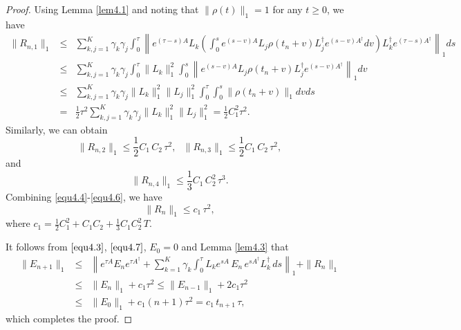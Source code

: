 \documentclass[10pt,a4paper]{amsart}
\begin{document}
\begin{proof}
Using Lemma \ref{lem4.1} and noting that $\|\rho(t)\|_1=1$ for any $t\geq0$, we have
\begin{eqnarray}\label{equ4.4}
\|R_{n,1}\|_1&\leq&\sum_{k,j=1}^K\gamma_k\gamma_j\int_0^{\tau}\left\|e^{(\tau-s)A}L_k
  \left(\int_0^se^{(s-v)A}L_j\rho(t_n+v)L_j^{\dag}e^{(s-v)A^{\dag}}dv\right)
  L_k^{\dag}e^{(\tau-s)A^{\dag}}\right\|_1ds\nonumber\\
  &\leq& \sum_{k,j=1}^K\gamma_k\gamma_j\int_0^{\tau}\|L_k\|_1^2
  \int_0^s\left\|e^{(s-v)A}L_j\rho(t_n+v)L_j^{\dag}e^{(s-v)A^{\dag}}\right\|_1dv\nonumber\\
  &\leq& \sum_{k,j=1}^K\gamma_k\gamma_j\|L_k\|_1^2\|L_j\|_1^2
  \int_0^{\tau}\int_0^s\|\rho(t_n+v)\|_1dvds\nonumber\\
  &=&\frac{1}{2}\tau^2\sum_{k,j=1}^K\gamma_k\gamma_j\|L_k\|_1^2\|L_j\|_1^2=\frac{1}{2}C_1^2\tau^2.
\end{eqnarray}
Similarly, we can obtain
\begin{equation}\label{equ4.5}
  \|R_{n,2}\|_1\leq\frac{1}{2}C_1 \, C_2 \, \tau^2,~~~\|R_{n,3}\|_1\leq\frac{1}{2}C_1\, C_2 \, \tau^2,
\end{equation}
and
\begin{equation}\label{equ4.6}
  \|R_{n,4}\|_1\leq\frac{1}{3}C_1 \, C_2^2 \, \tau^3.
\end{equation}
Combining \eqref{equ4.4}-\eqref{equ4.6}, we have
\begin{equation}\label{equ4.7}
  \|R_n\|_1\leq c_1 \, \tau^2,
\end{equation}
where $c_1=\frac{1}{2}C_1^2+C_1C_2+\frac{1}{3}C_1C_2^2 \, T$.

It follows from $\eqref{equ4.3}$, $\eqref{equ4.7}$, $E_0=0$ and Lemma \ref{lem4.3} that
\begin{eqnarray*}
  \|E_{n+1}\|_1&\leq&\left\|e^{\tau A}E_ne^{\tau A^{\dag}}+\sum_{k=1}^K\gamma_k
  \int_0^{\tau}L_ke^{sA} \, E_n  \, e^{sA^{\dag}} L_k^{\dag} \, ds\right\|_1+\|R_n\|_1\\
  &\leq& \|E_n\|_1+c_1\tau^2\leq \|E_{n-1}\|_1+2c_1\tau^2\\
  &\leq& \|E_0\|_1+c_1(n+1)\tau^2=c_1 \, t_{n+1} \, \tau,
\end{eqnarray*}
which completes the proof.
\end{proof}
\end{document}
